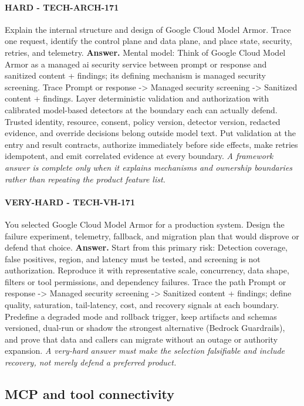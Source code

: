 \paragraph{HARD - TECH-ARCH-171} Explain the internal structure and design of Google Cloud Model Armor. Trace one request, identify the control plane and data plane, and place state, security, retries, and telemetry.
\textbf{Answer.} Mental model: Think of Google Cloud Model Armor as a managed ai security service between prompt or response and sanitized content + findings; its defining mechanism is managed security screening. Trace Prompt or response -> Managed security screening -> Sanitized content + findings. Layer deterministic validation and authorization with calibrated model-based detectors at the boundary each can actually defend. Trusted identity, resource, consent, policy version, detector version, redacted evidence, and override decisions belong outside model text. Put validation at the entry and result contracts, authorize immediately before side effects, make retries idempotent, and emit correlated evidence at every boundary.
\textit{A framework answer is complete only when it explains mechanisms and ownership boundaries rather than repeating the product feature list.}
\paragraph{VERY-HARD - TECH-VH-171} You selected Google Cloud Model Armor for a production system. Design the failure experiment, telemetry, fallback, and migration plan that would disprove or defend that choice.
\textbf{Answer.} Start from this primary risk: Detection coverage, false positives, region, and latency must be tested, and screening is not authorization. Reproduce it with representative scale, concurrency, data shape, filters or tool permissions, and dependency failures. Trace the path Prompt or response -> Managed security screening -> Sanitized content + findings; define quality, saturation, tail-latency, cost, and recovery signals at each boundary. Predefine a degraded mode and rollback trigger, keep artifacts and schemas versioned, dual-run or shadow the strongest alternative (Bedrock Guardrails), and prove that data and callers can migrate without an outage or authority expansion.
\textit{A very-hard answer must make the selection falsifiable and include recovery, not merely defend a preferred product.}
\subsection{MCP and tool connectivity}
